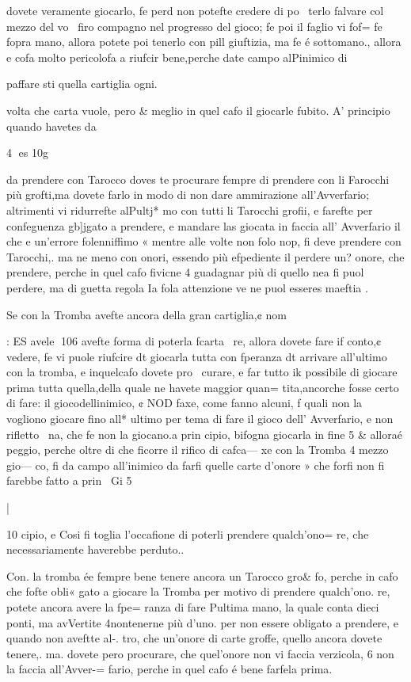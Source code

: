 \documentclass[12pt,a6paper]{article}
\begin{document}
dovete veramente giocarlo, fe
perd non potefte credere di po~
terlo falvare col mezzo del vo~
firo compagno nel progresso
del gioco; fe poi il faglio vi fof=
fe fopra mano, allora potete poi
tenerlo con pill giuftizia, ma fe
é sottomano., allora e cofa molto pericolofa a riufcir bene,perche date campo alPinimico di

 

paffare sti quella cartiglia ogni.

volta che carta vuole, pero &
meglio in quel cafo il giocarle
fubito.
A’ principio quando havetes
da

4
es
10g

da prendere con Tarocco doves
te procurare fempre di prendere con li Farocchi più grofti,ma
dovete farlo in modo di non dare ammirazione all’Avverfario;
altrimenti vi ridurrefte alPultj* mo con tutti li Tarocchi grofii,
e farefte per confeguenza gb]jgato a prendere, e mandare las
giocata in faccia all’ Avverfario
il che e un’errore folenniffimo «
mentre alle volte non folo nop,
fi deve prendere con Tarocchi,.
ma ne meno con onori, essendo
più efpediente il perdere un?
onore, che prendere, perche in
quel cafo fivicne 4 guadagnar
più di quello nea fi puol perdere, ma di guetta regola Ia fola
attenzione ve ne puol esseres
maeftia .

Se con la Tromba avefte ancora della gran cartiglia,¢ nom

: ES avele
106
avefte forma di poterla fcarta~
re, allora dovete fare if conto,¢
vedere, fe vi puole riufcire dt
giocarla tutta con fperanza dt
arrivare all’ultimo con la tromba, e inquelcafo dovete pro~
curare, e far tutto ik possibile di
giocare prima tutta quella,della
quale ne havete maggior quan=
tita,ancorche fosse certo di fare:
il giocodellinimico, ¢ NOD faxe, come fanno alcuni, f quali
non la vogliono giocare fino all*
ultimo per tema di fare il gioco
dell’ Avverfario, e non rifletto~ 
na, che fe non la giocano.a prin
cipio, bifogna giocarla in fine 5
& alloraé peggio, perche oltre
di che ficorre il rifico di cafca—
xe con la Tromba 4 mezzo gio—
co, fi da campo all’inimico da
farfi quelle carte d’onore » che
forfi non fi farebbe fatto a prin~
Gi 5

|
 

10
cipio, e Cosi fi toglia l’occafione
di poterli prendere qualch’ono=
re, che necessariamente haverebbe perduto..

Con. la tromba ée fempre bene
tenere ancora un Tarocco gro&
fo, perche in cafo che fofte obli«
gato a giocare la Tromba per
motivo di prendere qualch’ono.
re, potete ancora avere la fpe=
ranza di fare Pultima mano, la
quale conta dieci ponti, ma avVertite 4nontenerne più d’uno.
per non essere obligato a prendere, e quando non aveftte al-.
tro, che un’onore di carte groffe, quello ancora dovete tenere,.
ma. dovete pero procurare, che
quel’onore non vi faccia verzicola, 6 non la faccia all’Avver-=
fario, perche in quel cafo é bene farfela prima.
\end{document}
